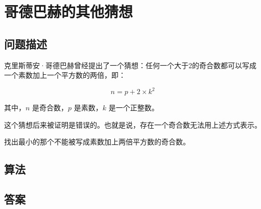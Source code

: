 \section{哥德巴赫的其他猜想}
\subsection{问题描述}
\begin{tcolorbox}
克里斯蒂安·哥德巴赫曾经提出了一个猜想：任何一个大于2的奇合数都可以写成一个素数加上一个平方数的两倍，即：

\[
n = p + 2 \times k^2
\]

其中，\( n \) 是奇合数，\( p \) 是素数，\( k \) 是一个正整数。

这个猜想后来被证明是错误的。也就是说，存在一个奇合数无法用上述方式表示。

找出最小的那个不能被写成素数加上两倍平方数的奇合数。
\end{tcolorbox}

\subsection{算法}


\subsection{答案}
